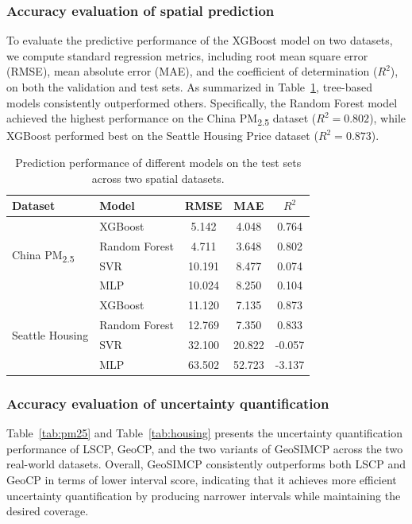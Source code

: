 \documentclass[authoryear,preprint,review,12pt]{elsarticle}
\begin{document}
\subsubsection{Accuracy evaluation of spatial prediction}

To evaluate the predictive performance of the XGBoost model on two datasets, we compute standard regression metrics, including root mean square error (RMSE), mean absolute error (MAE), and the coefficient of determination ($R^2$), on both the validation and test sets. As summarized in Table~\ref{tab:model_accuracy_all}, tree-based models consistently outperformed others. Specifically, the Random Forest model achieved the highest performance on the China PM\textsubscript{2.5} dataset ($R^2 = 0.802$), while XGBoost performed best on the Seattle Housing Price dataset ($R^2 = 0.873$).


\begin{table}[ht]
\centering
\caption{Prediction performance of different models on the test sets across two spatial datasets.}
\label{tab:model_accuracy_all}
\begin{tabular}{llccc}
\toprule
\textbf{Dataset} & \textbf{Model} & \textbf{RMSE} & \textbf{MAE} & \textbf{$R^2$} \\
\midrule
\multirow{4}{*}{China PM\textsubscript{2.5}} 
  & XGBoost        & 5.142  & 4.048  & 0.764 \\
  & Random Forest  & 4.711  & 3.648  & 0.802 \\
  & SVR            & 10.191 & 8.477  & 0.074 \\
  & MLP            & 10.024 & 8.250  & 0.104 \\
\midrule
\multirow{4}{*}{Seattle Housing} 
  & XGBoost        & 11.120 & 7.135  & 0.873 \\
  & Random Forest  & 12.769 & 7.350  & 0.833 \\
  & SVR            & 32.100 & 20.822 & -0.057 \\
  & MLP            & 63.502 & 52.723 & -3.137 \\
\bottomrule
\end{tabular}
\end{table}


\subsubsection{Accuracy evaluation of uncertainty quantification}


Table~\ref{tab:pm25} and Table~\ref{tab:housing} presents the uncertainty quantification performance of LSCP, GeoCP, and the two variants of GeoSIMCP across the two real-world datasets. Overall, GeoSIMCP consistently outperforms both LSCP and GeoCP in terms of lower interval score, indicating that it achieves more efficient uncertainty quantification by producing narrower intervals while maintaining the desired coverage.
\end{document}
